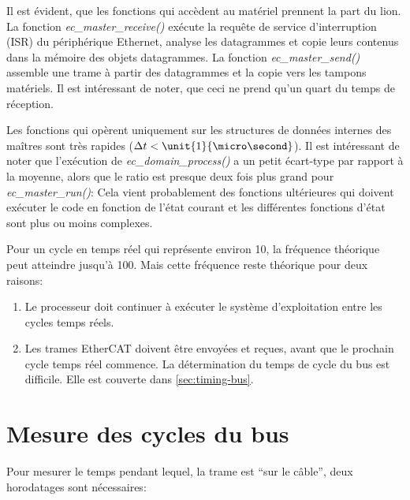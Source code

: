 \documentclass[a4paper,12pt,BCOR=6mm,bibtotoc,idxtotoc]{scrbook}
\begin{document}
Il est \'evident, que les fonctions qui acc\`edent au mat\'eriel
prennent la part du lion.  La fonction \textit{ec\_master\_receive()}
ex\'ecute la requ\^ete de service d'interruption (ISR) du p\'eriph\'erique
Ethernet, analyse les datagrammes et copie leurs contenus dans la
m\'emoire des objets datagrammes.  La fonction
\textit{ec\_master\_send()} assemble une trame \`a partir des
datagrammes et la copie vers les tampons mat\'eriels.  Il est
int\'eressant de noter, que ceci ne prend qu'un quart du temps de
r\'eception.

Les fonctions qui op\`erent uniquement sur les structures de donn\'ees
internes des ma\^itres sont tr\`es rapides ($\Delta t <
\unit{1}{\micro\second}$).  Il est int\'eressant de noter que
l'ex\'ecution de \textit{ec\_domain\_process()} a un petit \'ecart-type
par rapport \`a la moyenne, alors que le ratio est presque deux fois
plus grand pour \textit{ec\_master\_run()}: Cela vient probablement
des fonctions ult\'erieures qui doivent ex\'ecuter le code en fonction de
l'\'etat courant et les diff\'erentes fonctions d'\'etat sont plus ou moins
complexes.

Pour un cycle en temps r\'eel qui repr\'esente environ
\unit{10}{\micro\second}, la fr\'equence th\'eorique peut atteindre
jusqu'\`a \unit{100}{\kilo\hertz}.  Mais cette fr\'equence reste th\'eorique
pour deux raisons:

\begin{enumerate}

\item Le processeur doit continuer \`a ex\'ecuter le syst\`eme d'exploitation
  entre les cycles temps r\'eels.

\item Les trames EtherCAT doivent \^etre envoy\'ees et re\c{c}ues, avant que
  le prochain cycle temps r\'eel commence. La d\'etermination du temps de
  cycle du bus est difficile. Elle est couverte dans
  \autoref{sec:timing-bus}.

\end{enumerate}


\section{Mesure des cycles du bus}
\label{sec:timing-bus}

Pour mesurer le temps pendant lequel, la trame est ``sur le c\^able'',
deux horodatages sont n\'ecessaires:
\end{document}
